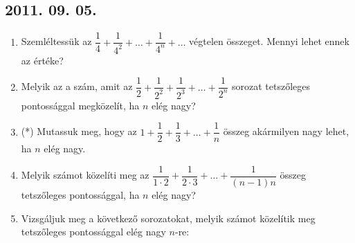 \subsection*{2011. 09. 05.}
\begin{enumerate}
\item Szemléltessük az
	$\dfrac{1}{4}+\dfrac{1}{4^2}+\ldots+\dfrac{1}{4^n}+\ldots$
	végtelen összeget. Mennyi lehet ennek az értéke?

\item Melyik az a szám, amit az
   $\dfrac{1}{2}+\dfrac{1}{2^2}+\dfrac{1}{2^3}+\ldots+\dfrac{1}{2^n}$
   sorozat tetszőleges pontossággal megközelít, ha $n$ elég nagy?

\item (*) Mutassuk meg, hogy az
	$1+\dfrac{1}{2}+\dfrac{1}{3}+\ldots+\dfrac{1}{n}$
	összeg akármilyen nagy lehet, ha $n$ elég nagy.

\item Melyik számot közelíti meg az
	$\dfrac{1}{1\cdot2}+\dfrac{1}{2\cdot3}+\ldots+\dfrac{1}{(n-1)n}$
   összeg tetszőleges pontossággal, ha $n$ elég nagy?

\item Vizsgáljuk meg a következő sorozatokat, melyik számot közelítik meg tetszőleges pontossággal elég nagy $n$-re:
\end{enumerate}

